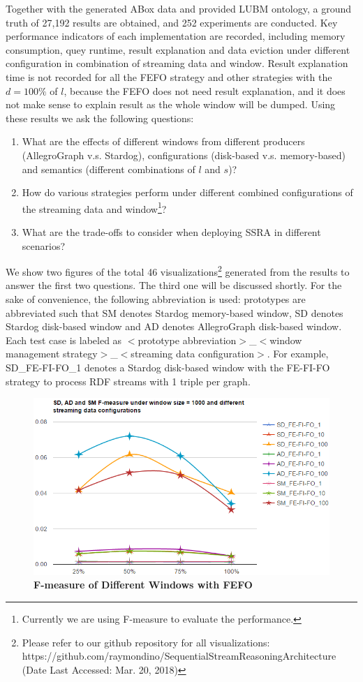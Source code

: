 Together with the generated ABox data and provided LUBM ontology, a ground truth of 27,192 results are obtained, and 252 experiments are conducted.
Key performance indicators of each implementation are recorded, including memory consumption, quey runtime, result explanation and data eviction under different configuration in combination of streaming data and window. 
Result explanation time is not recorded for all the FEFO strategy and other strategies with the $d = 100\%$ of $l$, because the FEFO does not need result explanation, and it does not make sense to explain result as the whole window will be dumped. 
Using these results we ask the following questions:
\begin{enumerate}
	\item What are the effects of different windows from different producers (AllegroGraph v.s. Stardog), configurations (disk-based v.s. memory-based) and semantics (different combinations of $l$ and $s$)?
    \item How do various strategies perform under different combined configurations of the streaming data and window\footnote{Currently we are using F-measure to evaluate the performance.}?
    \item What are the trade-offs to consider when deploying SSRA in different scenarios?
\end{enumerate}

We show two figures of the total 46 visualizations\footnote{Please refer to our github repository for all visualizations: https://github.com/raymondino/SequentialStreamReasoningArchitecture (Date Last Accessed: Mar. 20, 2018)} generated from the results to answer the first two questions. 
The third one will be discussed shortly. 
For the sake of convenience, the following abbreviation is used: 
prototypes are abbreviated such that SM denotes Stardog memory-based window, SD denotes Stardog disk-based window and AD denotes AllegroGraph disk-based window. 
Each test case is labeled as $<$prototype abbreviation$>$\_$<$window management strategy$>$\_$<$streaming data configuration$>$. 
For example, SD\_FE-FI-FO\_1 denotes a Stardog disk-based window with the FE-FI-FO strategy to process RDF streams with 1 triple per graph.

\begin{figure}[!htbp]
	\centering
	\includegraphics[width=5in]{img/4-ff.png}
	\caption{\textbf{F-measure of Different Windows with FEFO}}
	\label{fig:fefo}
\end{figure}

